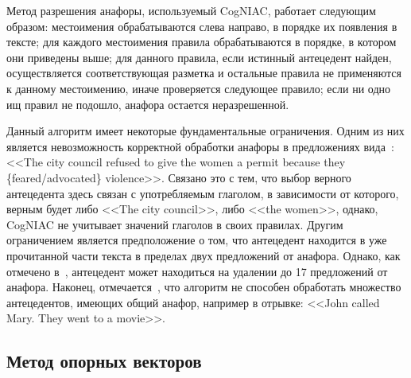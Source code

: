 Метод разрешения анафоры, используемый CogNIAC, работает следующим образом: местоимения обрабатываются слева направо, в порядке их появления в тексте; для каждого местоимения правила обрабатываются в порядке, в котором они приведены выше; для данного правила, если истинный антецедент найден, осуществляется соответствующая разметка и остальные правила не применяются к данному местоимению, иначе проверяется следующее правило; если ни одно ищ правил не подошло, анафора остается неразрешенной.

Данный алгоритм имеет некоторые фундаментальные ограничения. Одним из них является невозможность корректной обработки анафоры в предложениях вида~\cite{winograd1972understanding}: <<The city council refused to give the women a permit because they \{feared/advocated\} violence>>. Связано это с тем, что выбор верного антецедента здесь связан с употребляемым глаголом, в зависимости от которого, верным будет либо <<The city council>>, либо <<the women>>, однако, CogNIAC не учитывает значений глаголов в своих правилах. Другим ограничением является предположение о том, что антецедент находится в уже прочитанной части текста в пределах двух предложений от анафора. Однако, как отмечено в~\cite{mitkovStateOfArt}, антецедент может находиться на удалении до 17 предложений от анафора. Наконец, отмечается~\cite{baldwin1997cogniac}, что алгоритм не способен обработать множество антецедентов, имеющих общий анафор, например в отрывке: <<John called Mary. They went to a movie>>.

\subsection{Метод опорных векторов}

